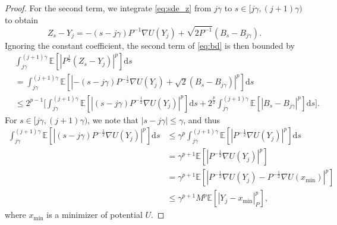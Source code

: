 \documentclass[11pt]{article}
\theoremstyle{plain}
\theoremstyle{definition}
\theoremstyle{remark}
\begin{document}
\begin{proof}
For the second term, we integrate \eqref{eq:sde_z} from $j\gamma$ to $s \in [j \gamma, (j+1)\gamma )$  to obtain 
\begin{equation} \nonumber
 Z_s - Y_j   =    -(s - j\gamma) P^{-1} \nabla U(Y_j) + \sqrt{2P^{-1}} (B_s - B_{j\gamma}).  
\end{equation}
Ignoring the constant coefficient, the second term of \eqref{eq:bd} is then bounded by
\begin{equation}\label{eq:bd0}
\begin{split}
&\int_{j\gamma}^{(j+1) \gamma} 
\mathbb{E} [ | P^{\frac{1}{2}}(Z_s-Y_j)|^p ] \mathrm{d} s 
\\
&= \int_{j\gamma}^{(j+1) \gamma}\mathbb{E} [ | 
-(s - j\gamma) P^{-\frac{1}{2}} \nabla U(Y_j) + \sqrt{2} (B_s - B_{j\gamma})
|^p ] \mathrm{d} s \\
&\leq 2^{p-1}\bigg [
 \int_{j\gamma}^{(j+1) \gamma} \mathbb{E} [ | 
(s - j\gamma) P^{-\frac{1}{2}} \nabla U(Y_j) |^p] \mathrm{d} s
+ 2^{\frac{p}{2}} \int_{j\gamma}^{(j+1) \gamma} \mathbb{E} [|B_s - B_{j\gamma} |^p] \mathrm{d}s \bigg ].
\end{split}
\end{equation}
For $s \in [j\gamma, (j+1) \gamma)$, we note that $|s - j\gamma| \leq \gamma$, and thus
\begin{equation}\label{eq:bd1}
\begin{split}
\int_{j\gamma}^{(j+1) \gamma} \mathbb{E} [ | 
(s - j\gamma) P^{-\frac{1}{2}} \nabla U(Y_j) |^p] \mathrm{d} s
&\leq \gamma^p \int_{j\gamma}^{(j+1) \gamma}  \mathbb{E} [
|P^{-\frac{1}{2}} \nabla U(Y_j) |^p
] \mathrm{d} s \\
&= \gamma^{p+1} \mathbb{E} [
|P^{-\frac{1}{2}} \nabla U(Y_j) |^p
] \\
&= \gamma^{p+1} \mathbb{E} [
|P^{-\frac{1}{2}} \nabla U(Y_j) - P^{-\frac{1}{2}} \nabla U(x_{\min}) |^p
]  \\
&\leq \gamma^{p+1} M^p  \mathbb{E} [ | Y_j - x_{\min} |_P^p ], 
\end{split}
\end{equation}
where $x_{\min}$ is a minimizer of potential $U$.


\end{proof}
\end{document}
